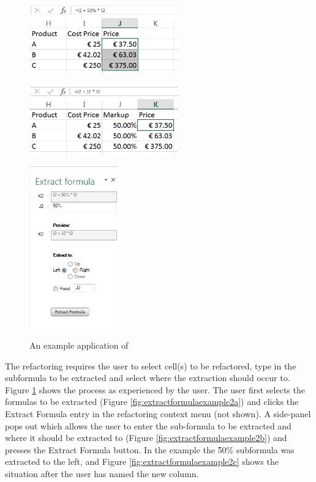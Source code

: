 \begin{figure}
\begin{minipage}[c][8cm][c]{0.5\textwidth}
\centering
\vspace*{\fill}
\includegraphics[height=3cm]{implementation/extractformula/21}
\label{fig:extractformulaexample2a}

\includegraphics[height=3cm]{implementation/extractformula/23}
\addtocounter{subfigure}{1}
\label{fig:extractformulaexample2c}
\end{minipage}
\begin{minipage}[c][8cm][t]{0.5\textwidth}
\vspace*{\fill}
\centering
\includegraphics[height=7cm]{implementation/extractformula/22}
\addtocounter{subfigure}{-2}
\label{fig:extractformulaexample2b}
\end{minipage}
\caption{An example application of }
\label{fig:extractformulaexample2}
\end{figure}

The refactoring requires the user to select cell(s) to be refactored, type in the subformula to be extracted and select where the extraction should occur to.
Figure \ref{fig:extractformulaexample2} shows the process as experienced by the user.
The user first selects the formulas to be extracted (Figure \ref{fig:extractformulaexample2a}) and clicks the Extract Formula entry in the refactoring context menu (not shown).
A side-panel pops out which allows the user to enter the sub-formula to be extracted and where it should be extracted to (Figure \ref{fig:extractformulaexample2b}) and presses the Extract Formula button.
In the example the \f{50\%} subformula was extracted to the left, and Figure \ref{fig:extractformulaexample2c} shows the situation after the user has named the new column.

